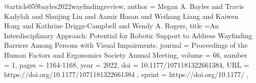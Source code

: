@article{059bayles2022wayfindingreview,
author = {Megan A. Bayles and Travis Kadylak and Shuijing Liu and Aamir Hasan and Weihang Liang and Kaiwen Hong and Kathrine Driggs-Campbell and Wendy A. Rogers},
title ={An Interdisciplinary Approach: Potential for Robotic Support to Address Wayfinding Barriers Among Persons with Visual Impairments},
journal = {Proceedings of the Human Factors and Ergonomics Society Annual Meeting},
volume = {66},
number = {1},
pages = {1164-1168},
year = {2022},
doi = {10.1177/1071181322661384},
URL = { https://doi.org/10.1177/1071181322661384 },
eprint = { https://doi.org/10.1177/ },
}